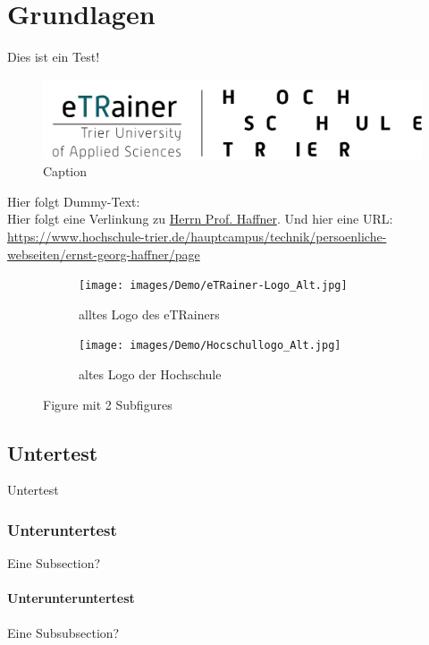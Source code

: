\chapter{Grundlagen}
Dies ist ein Test!
\begin{figure}[h]
    \centering
    \includegraphics[width=\textwidth]{images/eTRainer-Logo.png}
    \caption{Caption}
    \label{fig:my_label}
\end{figure}

Hier folgt Dummy-Text:\\
Hier folgt eine Verlinkung zu \href{https://www.youtube.com/watch?v=o-YBDTqX_ZU}{Herrn Prof. Haffner}.
Und hier eine URL: \href{https://www.hochschule-trier.de/hauptcampus/technik/persoenliche-webseiten/ernst-georg-haffner/page}{https://www.hochschule-trier.de/hauptcampus/technik/persoenliche-webseiten/ernst-georg-haffner/page}

\begin{figure}
     \centering
     \begin{subfigure}[b]{0.45\textwidth}
         \centering
         \texttt{[image: images/Demo/eTRainer-Logo\_Alt.jpg]}
         \caption{alltes Logo des eTRainers}
         \label{fig:eTRainer_Alt}
     \end{subfigure}
     \hfill
     \begin{subfigure}[b]{0.45\textwidth}
         \centering
         \texttt{[image: images/Demo/Hocschullogo\_Alt.jpg]}
         \caption{altes Logo der Hochschule}
         \label{fig:Hochschule_Alt}
     \end{subfigure}
     \caption{Figure mit 2 Subfigures}
\end{figure}

\section{Untertest}
Untertest

\subsection{Unteruntertest}
Eine Subsection?

\subsubsection{Unterunteruntertest}
Eine Subsubsection?\\
\TEX



